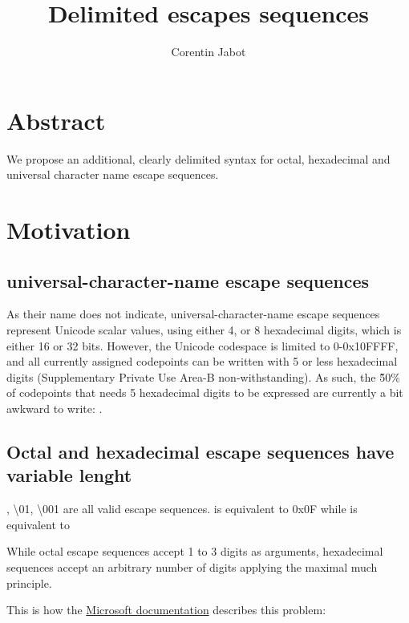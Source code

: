 \documentclass{wg21}
\title{Delimited escapes sequences}
\author{Corentin Jabot}{corentin.jabot@gmail.com}
\begin{document}
    \maketitle
    
    \paperquote{}
    
    \section{Abstract}
    
    We propose an additional, clearly delimited syntax for octal, hexadecimal and universal character name escape sequences.
    
    
    \section{Motivation}
    
    \subsection{universal-character-name escape sequences}
    
    As their name does not indicate, universal-character-name escape sequences represent Unicode scalar values,
    using either 4, or 8 hexadecimal digits, which is either 16 or 32 bits.
    However, the Unicode codespace is limited to 0-0x10FFFF, and all currently assigned codepoints can be written with 5 or less
    hexadecimal digits (Supplementary Private Use Area-B non-withstanding).
    As such, the \~50\% of codepoints that needs 5 hexadecimal digits to be expressed are currently a bit awkward to write: .
    
    \subsection{Octal and hexadecimal escape sequences have variable lenght}
    
    , {\textbackslash 01}, {\textbackslash 001} are all valid escape sequences.
     is equivalent to 0x0F while  is equivalent to 
    
    While octal escape sequences accept 1 to 3 digits as arguments, hexadecimal sequences accept an arbitrary number of digits
    applying the maximal much principle.
    
    
    This is how the \href{https://docs.microsoft.com/en-us/cpp/c-language/octal-and-hexadecimal-character-specifications?view=msvc-160}{Microsoft documentation} describes this problem:
    
\end{document}
